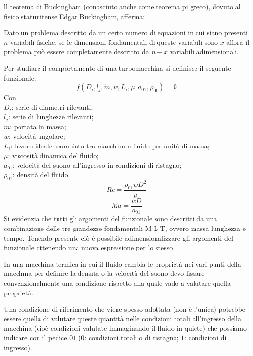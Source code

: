 ll teorema di Buckingham (conosciuto anche come teorema pi greco), dovuto al fisico statunitense Edgar Buckingham, afferma:
\begin{quoting}
Dato un problema descritto da un certo numero di equazioni in cui siano presenti $n$ variabili fisiche, se le dimensioni fondamentali di queste variabili sono $x$ allora il problema può essere completamente descritto da $n - x$ variabili adimensionali.
\end{quoting}
Per studiare il comportamento di una turbomacchina si definisce il seguente funzionale.
\begin{equation}
f(D_i,l_j,\dot{m},w,L_i,\mu,a_{01},\rho_{01})=0
\end{equation}
Con\\
$D_i$: serie di diametri rilevanti;\\
$l_j$: serie di lunghezze rilevanti;\\
$\dot{m}$: portata in massa;\\
$w$: velocità angolare;\\
$L_i$: lavoro ideale scambiato tra macchina e fluido per unità di massa;\\
$\mu$: viscosità dinamica del fluido;\\
$a_{01}$: velocità del suono all'ingresso in condizioni di ristagno;\\
$\rho_{01}$: densità del fluido.
\begin{equation}
Re= \frac{\rho_{01} w D^2}{\mu}
\end{equation}
\begin{equation}
Ma= \frac{w D}{a_{01}}
\end{equation}
Si evidenzia che tutti gli argomenti del funzionale sono descritti da una combinazione delle tre grandezze fondamentali M L T, ovvero massa lunghezza e tempo. Tenendo presente ciò è possibile adimensionalizzare gli argomenti del funzionale ottenendo una nuova espressione per lo stesso.

In una macchina termica in cui il fluido cambia le proprietà nei vari punti della macchina per definire la densità o la velocità del suono devo fissare
convenzionalmente una condizione rispetto alla quale vado a valutare quella
proprietà. 

Una condizione di riferimento che viene spesso adottata (non è
l’unica) potrebbe essere quella di valutare queste quantità nelle condizioni
totali all’ingresso della macchina (cioè condizioni valutate immaginando il fluido in quiete) che possiamo indicare con il pedice $01$ ($0$: condizioni totali o di ristagno; $1$: condizioni di ingresso).

